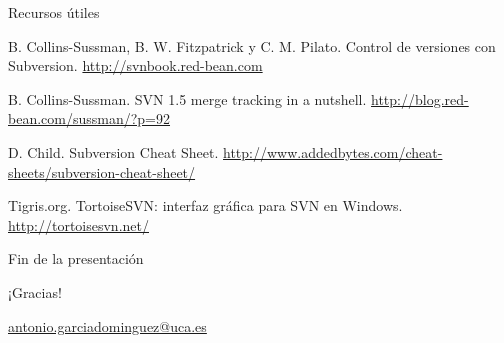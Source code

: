 \documentclass[xcolor=svgnames]{beamer}
\begin{document}
\appendix

\begin{frame}{Recursos útiles}

  \begin{thebibliography}{99}
    \beamertemplatebookbibitems
     B. Collins-Sussman, B. W. Fitzpatrick y C. M. Pilato.
      \newblock Control de versiones con Subversion.
      \newblock \url{http://svnbook.red-bean.com}

    \beamertemplatearticlebibitems
     B. Collins-Sussman.
      \newblock SVN 1.5 merge tracking in a nutshell.
      \newblock \url{http://blog.red-bean.com/sussman/?p=92}

     D. Child.
      \newblock Subversion Cheat Sheet.
      \newblock \url{http://www.addedbytes.com/cheat-sheets/subversion-cheat-sheet/}

     Tigris.org.
      \newblock TortoiseSVN: interfaz gráfica para SVN en Windows.
      \newblock \url{http://tortoisesvn.net/}
  \end{thebibliography}
  
\end{frame}

\begin{frame}{Fin de la presentación}
  \begin{center}
    {\Huge ¡Gracias!}

    \vspace{3em}

    {\Large
      \href{mailto:antonio.garciadominguez@uca.es}{antonio.garciadominguez@uca.es}}
  \end{center}
\end{frame}
\end{document}
